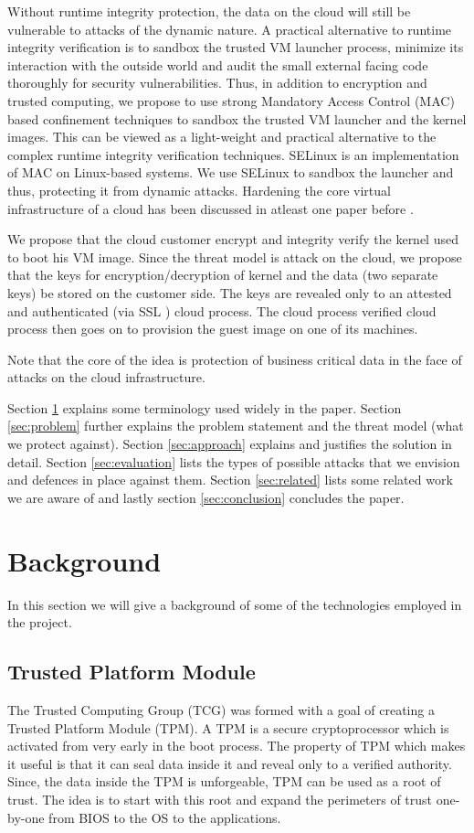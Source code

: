 \documentclass[10pt,twocolumn,pdftex]{article}
\begin{document}
Without runtime integrity protection, the data on the cloud will still be vulnerable to attacks of the dynamic nature. A practical alternative to runtime integrity verification is to sandbox the trusted VM launcher process, minimize its interaction with the outside world and audit the small external facing code thoroughly for security vulnerabilities. Thus, in addition to encryption and trusted computing, we propose to use strong Mandatory Access Control (MAC) based confinement techniques to sandbox the trusted VM launcher and the kernel images. This can be viewed as a light-weight and practical alternative to the complex runtime integrity verification techniques. SELinux \cite{SELinux} is an implementation of MAC on Linux-based systems. We use SELinux to sandbox the launcher and thus, protecting it from dynamic attacks. Hardening the core virtual infrastructure of a cloud has been discussed in atleast one paper before \cite{secure-cloud-core}. 

We propose that the cloud customer encrypt and integrity verify the kernel used to boot his VM image. Since the threat model is attack on the cloud, we propose that the keys for encryption/decryption of kernel and the data (two separate keys) be stored on the customer side. The keys are revealed only to an attested and authenticated (via SSL \cite{SSL}) cloud process. The cloud process verified cloud process then goes on to provision the guest image on one of its machines.

Note that the core of the idea is protection of business critical data in the face of attacks on the cloud infrastructure.

Section \ref{sec:background} explains some terminology used widely in the paper. Section \ref{sec:problem} further explains the problem statement and the threat model (what we protect against). Section \ref{sec:approach} explains and justifies the solution in detail. Section \ref{sec:evaluation} lists the types of possible attacks that we envision and defences in place against them. Section \ref{sec:related} lists some related work we are aware of and lastly section \ref{sec:conclusion} concludes the paper.

\section{Background}
\label{sec:background}
In this section we will give a background of some of the technologies employed in the project.

\subsection{Trusted Platform Module}
The Trusted Computing Group (TCG) \cite{TCG} was formed with a goal of creating a Trusted Platform Module (TPM). A TPM is a secure cryptoprocessor which is activated from very early in the boot process. The property of TPM which makes it useful is that it can seal data inside it and reveal only to a verified authority. Since, the data inside the TPM is unforgeable, TPM can be used as a root of trust. The idea is to start with this root and expand the perimeters of trust one-by-one from BIOS to the OS to the applications.
\end{document}

